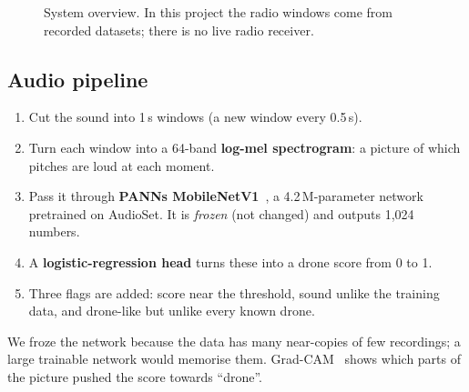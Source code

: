 \documentclass[conference,a4paper]{IEEEtran}
\begin{document}
\begin{figure}[!t]
\centering
{}
\caption{System overview. In this project the radio windows come from recorded datasets; there is
no live radio receiver.}
\label{fig:pipeline}
\end{figure}

\subsection{Audio pipeline}
\begin{enumerate}
  \item Cut the sound into 1\,s windows (a new window every 0.5\,s).
  \item Turn each window into a 64-band \textbf{log-mel spectrogram}: a picture of which pitches
        are loud at each moment.
  \item Pass it through \textbf{PANNs MobileNetV1}~\cite{panns}, a 4.2\,M-parameter network
        pretrained on AudioSet. It is \emph{frozen} (not changed) and outputs 1,024 numbers.
  \item A \textbf{logistic-regression head} turns these into a drone score from 0 to 1.
  \item Three flags are added: score near the threshold, sound unlike the training data, and
        drone-like but unlike every known drone.
\end{enumerate}
We froze the network because the data has many near-copies of few recordings; a large trainable
network would memorise them. Grad-CAM~\cite{gradcam} shows which parts of the picture pushed the
score towards ``drone''.
\end{document}
